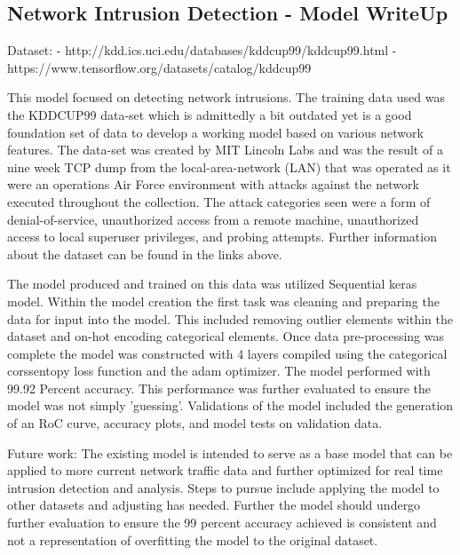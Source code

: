 \subsection{Network Intrusion Detection - Model WriteUp}
Dataset: 
- http://kdd.ics.uci.edu/databases/kddcup99/kddcup99.html
- https://www.tensorflow.org/datasets/catalog/kddcup99

This model focused on detecting network intrusions. The training data used was the KDDCUP99 data-set which is admittedly a bit outdated yet is a good foundation set of data to develop a working model based on various network features. The data-set was created by MIT Lincoln Labs and was the result of a nine week TCP dump from the local-area-network (LAN) that was operated as it were an operations Air Force environment with attacks against the network executed throughout the collection. The attack categories seen were a form of denial-of-service, unauthorized access from a remote machine, unauthorized access to local superuser privileges, and probing attempts. Further information about the dataset can be found in the links above. 

The model produced and trained on this data was utilized Sequential keras model. Within the model creation the first task was cleaning and preparing the data for input into the model. This included removing outlier elements within the dataset and on-hot encoding categorical elements. Once data pre-processing was complete the model was constructed with 4 layers compiled using the categorical corssentopy loss function and the adam optimizer. The model performed with 99.92 Percent accuracy. This performance was further evaluated to ensure the model was not simply 'guessing'. Validations of the model included the generation of an RoC curve, accuracy plots, and model tests on validation data. 

Future work: The existing model is intended to serve as a base model that can be applied to more current network traffic data and further optimized for real time intrusion detection and analysis. Steps to pursue include applying the model to other datasets and adjusting has needed. Further the model should undergo further evaluation to ensure the 99 percent accuracy achieved is consistent and not a representation of overfitting the model to the original dataset. 